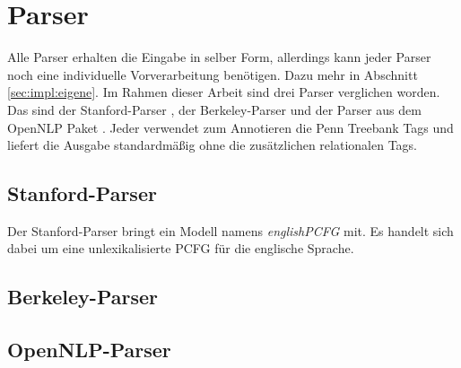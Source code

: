 \section{Parser}

Alle Parser erhalten die Eingabe in selber Form, allerdings kann jeder Parser noch eine individuelle Vorverarbeitung benötigen. Dazu mehr in Abschnitt \ref{sec:impl:eigene}.
Im Rahmen dieser Arbeit sind drei Parser verglichen worden. Das sind der Stanford-Parser \cite{stanfordparser}, der Berkeley-Parser \cite{berkeleyparser1} und der Parser aus dem OpenNLP Paket \cite{openNlpManual}. Jeder verwendet zum Annotieren die Penn Treebank Tags und liefert die Ausgabe standardmäßig ohne die zusätzlichen relationalen Tags. 



\subsection{Stanford-Parser}
Der Stanford-Parser bringt ein Modell namens \textit{englishPCFG} mit. Es handelt sich dabei um eine unlexikalisierte PCFG für die englische Sprache. 
\subsection{Berkeley-Parser}

\subsection{OpenNLP-Parser}


